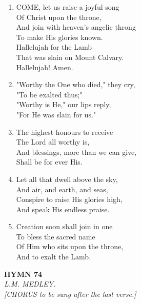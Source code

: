 \documentclass[11pt,a4paper]{article}
\begin{document}
\begin{enumerate}
    \item COME, let us raise a joyful song \\
        Of Christ upon the throne, \\
        And join with heaven's angelic throng \\
        To make His glories known. \\
        Hallelujah for the Lamb \\
        That was slain on Mount Calvary. \\
        Hallelujah! Amen.

    \item "Worthy the One who died," they cry, \\
        "To be exalted thus;" \\
        "Worthy is He," our lips reply, \\
        "For He was slain for us."

    \item The highest honours to receive \\
        The Lord all worthy is, \\
        And blessings, more than we can give, \\
        Shall be for ever His.

    \item Let all that dwell above the sky, \\
        And air, and earth, and seas, \\
        Conspire to raise His glories high, \\
        And speak His endless praise.

    \item Creation soon shall join in one \\
        To bless the sacred name \\
        Of Him who sits upon the throne, \\
        And to exalt the Lamb.

\end{enumerate}

\newpage
\begin{center}
    {\Large \textbf{HYMN 74}}
    \\
    \textit{L.M. MEDLEY.}
    \\
    \textit{\small [CHORUS to be sung after the last verse.]}
\end{center}
\vspace{1em}
\end{document}
